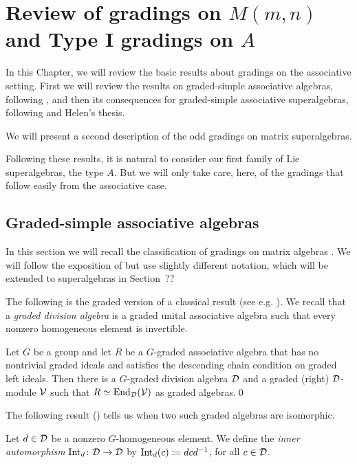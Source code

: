 \chapter{Review of gradings on $M(m,n)$ and Type I gradings on $A$}\label{chap:A-type-I}

In this Chapter, we will review the basic results about gradings on the associative setting. 
First we will review the results on graded-simple associative algebras, following \cite{BK10}, and then its consequences for graded-simple associative superalgebras, following \cite{paper-MAP} and Helen's thesis. 

We will present a second description of the odd gradings on matrix superalgebras.

Following these results, it is natural to consider our first family of Lie superalgebras, the type $A$. 
But we will only take care, here, of the gradings that follow easily from the associative case.


\section{Graded-simple associative algebras}


In this section we will recall the classification of gradings on matrix algebras \cite{BSZ01, BZ02, BK10}. We will follow the exposition of \cite[Chapter 2]{livromicha} but use slightly different notation, which will be extended to superalgebras in Section~??%

The following is the graded version of a classical result (see e.g. \cite[Theorem 2.6]{livromicha}). 
We recall that a \emph{graded division algebra} is a graded unital associative algebra such that every nonzero homogeneous element is invertible.

\begin{thm}\label{thm:End-over-D}
	Let $G$ be a group and let $R$ be a $G$-graded associative algebra that has no nontrivial graded ideals and satisfies the descending chain condition on 
	graded left ideals. Then there is a $G$-graded division algebra $\mathcal{D}$ and a graded (right) $\mathcal{D}$-module $\mathcal V$ such that $R \simeq \operatorname{End}_{\mathcal{D}} (\mathcal V)$ as graded algebras.\qed
\end{thm}

The following result (\cite[Theorem 2.10]{livromicha}) tells us when two such graded algebras are isomorphic.

\begin{defi}
    Let $d\in \mathcal{D}$ be a nonzero $G$-homogeneous element. 
    We define the \emph{inner automorphism} $\operatorname{Int}_d\colon \mathcal{D} \to \mathcal{D}$ by $\operatorname{Int}_d (c) \coloneqq dcd^{-1}$, for all $c\in \mathcal{D}$.
\end{defi}

